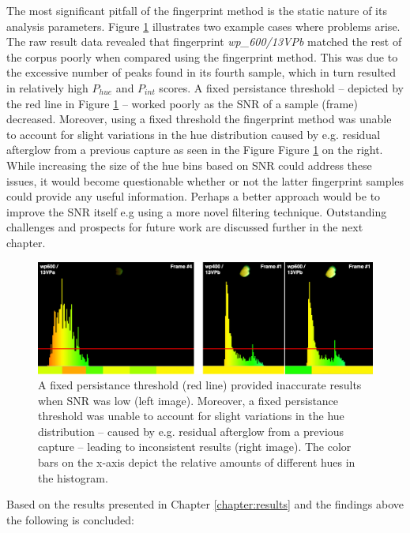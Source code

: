 \documentclass[thesis.tex]{subfiles}
\begin{document}
The most significant pitfall of the fingerprint method is the static nature of its analysis parameters. Figure \ref{figure:fingerprint-method-pitfalls} illustrates two example cases where problems arise. The raw result data revealed that fingerprint \emph{wp\_600/13VPb} matched the rest of the corpus poorly when compared using the fingerprint method. This was due to the excessive number of peaks found in its fourth sample, which in turn resulted in relatively high $P_{hue}$ and $P_{int}$ scores. A fixed persistance threshold -- depicted by the red line in Figure \ref{figure:fingerprint-method-pitfalls} -- worked poorly as the SNR of a sample (frame) decreased. Moreover, using a fixed threshold the fingerprint method was unable to account for slight variations in the hue distribution caused by e.g. residual afterglow from a previous capture as seen in the Figure Figure \ref{figure:fingerprint-method-pitfalls} on the right. While increasing the size of the hue bins based on SNR could address these issues, it would become questionable whether or not the latter fingerprint samples could provide any useful information. Perhaps a better approach would be to improve the SNR itself e.g using a more novel filtering technique. Outstanding challenges and prospects for future work are discussed further in the next chapter.

\begin{figure}[h!]
  \centering \includegraphics[page=1,width=\textwidth]{images/findings/persistance_pitfall}
  \caption{A fixed persistance threshold (red line) provided inaccurate results when SNR was low (left image). Moreover, a fixed persistance threshold was unable to account for slight variations in the hue distribution -- caused by e.g. residual afterglow from a previous capture -- leading to inconsistent results (right image). The color bars on the x-axis depict the relative amounts of different hues in the histogram.}
  \label{figure:fingerprint-method-pitfalls}
\end{figure}

Based on the results presented in Chapter \ref{chapter:results} and the findings above the following is concluded:
\clearpage
\end{document}
